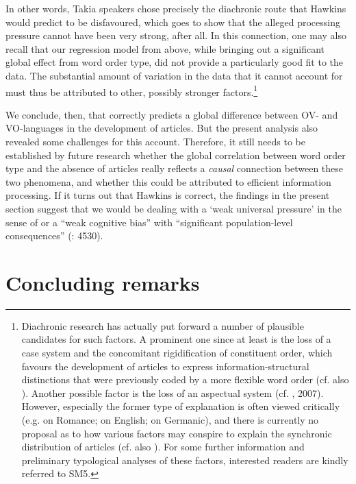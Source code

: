 \documentclass[output=paper]{langsci/langscibook}
\begin{document}
In other words, Takia speakers chose precisely the diachronic route that Hawkins would predict to be disfavoured, which goes to show that the alleged processing pressure cannot have been very strong, after all. In this connection, one may also recall that our regression model from above, while bringing out a significant global effect from word order type, did not provide a particularly good fit to the data. The substantial amount of variation in the data that it cannot account for must thus be attributed to other, possibly stronger factors.\footnote{Diachronic research has actually put forward a number of plausible candidates for such factors. A prominent one since at least \citet{Vennemann1975} is the loss of a case system and the concomitant rigidification of constituent order, which favours the development of articles to express information-structural distinctions that were previously coded by a more flexible word order (cf. also \citealt{Hawkins2004,HewsonBubenik2006,Fischer2010,CarlierLamiroy2014}). Another possible factor is the loss of an aspectual system (cf. \citealt{Abraham1997,Leiss2000}, 2007). However, especially the former type of explanation is often viewed critically (e.g. \citealt{Selig1992} on Romance;  \citealt{McCollMillar2000} on English; \citealt{Leiss2000} on Germanic), and there is currently no proposal as to how various factors may conspire to explain the synchronic distribution of articles (cf. also \citealt{Lüdtke1991}). For some further information and preliminary typological analyses of these factors, interested readers are kindly referred to SM5.}

We conclude, then, that \citet{Hawkins2014_VarEff} correctly predicts a global difference between OV- and VO-languages in the development of articles. But the present analysis also revealed some challenges for this account. Therefore, it still needs to be established by future research whether the global correlation between word order type and the absence of articles really reflects a \textit{causal} connection between these two phenomena, and whether this could be attributed to efficient information processing. If it turns out that Hawkins is correct, the findings in the present section suggest that we would be dealing with a ‘weak universal pressure’ in the sense of  or a “weak cognitive bias” with “significant population-level consequences” (\citealt{ThompsonEtAl2016}: 4530).

\section{ Concluding remarks} 
\end{document}
